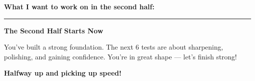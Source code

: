 {\begin{tcolorbox}[
    enhanced,
    colback=funPinkLight,
    colframe=funPink!50,
    arc=10pt,
    boxrule=1.5pt,
    left=6mm, right=6mm, top=5mm, bottom=5mm,
]
\textbf{What I want to work on in the second half:} \rule[-2pt]{4cm}{0.5pt}
\end{tcolorbox}

\vspace{3mm}

\begin{tcolorbox}[
    enhanced,
    colback=funYellowLight,
    colframe=funYellow!60,
    arc=10pt,
    boxrule=1pt,
    left=6mm, right=6mm, top=4mm, bottom=4mm,
]
{\bfseries\color{funYellowDark} \faLightbulb\hspace{2mm}The Second Half Starts Now}

\vspace{2mm}

You've built a strong foundation. The next 6 tests are about sharpening, polishing, and gaining confidence. You're in great shape — let's finish strong!
\end{tcolorbox}

\vspace{4mm}

\begin{center}
{\large\bfseries\color{funPinkDark} \faMountain\hspace{2mm}Halfway up and picking up speed!\hspace{2mm}\faMountain}
\end{center}

}
\newpage
